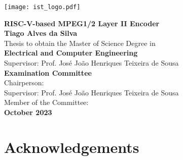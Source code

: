 \documentclass[10pt]{esda}
\title{}
\author{}
\date{}
\begin{document}
\texttt{[image: ist\_logo.pdf]}

\thispagestyle{empty}

\begin{onehalfspace}

\begin{center}
\begin{Large}
  \vspace{4cm}
  {\bf \Large {RISC-V-based MPEG1/2 Layer II Encoder}}\\
  \vspace{2.5cm}
  {\bf \Large Tiago Alves da Silva}\\
  \vspace{2cm}
  \Large {Thesis to obtain the Master of Science Degree in}\\
  \vspace{2mm}
  {\bf \Large {Electrical and Computer Engineering}}\\
  \vspace{2cm}
  \Large {Supervisor: Prof. José João Henriques Teixeira de Sousa}\\
  \vspace{1.5cm}
  {\bf \Large Examination Committee}\\
  \Large {Chairperson: }\\
  \Large {Supervisor: Prof. José João Henriques Teixeira de Sousa}\\
  \Large {Member of the Committee: }\\

  \vspace{2cm}
  {\bf \Large October 2023 }
\end{Large}
\end{center}

\end{onehalfspace}


\cleardoublepage

\section*{Acknowledgements}

\end{document}
